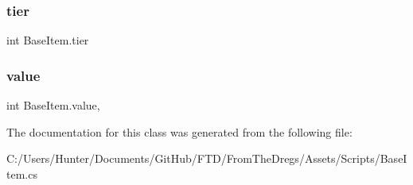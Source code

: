 \subsubsection{\texorpdfstring{tier}{tier}}
{\footnotesize\ttfamily int Base\+Item.\+tier\hspace{0.3cm}{\ttfamily [get]}}

\mbox{\label{class_base_item_ac246c2f3f1b1b6e3cae9bef5c26268a2}} 
\subsubsection{\texorpdfstring{value}{value}}
{\footnotesize\ttfamily int Base\+Item.\+value\hspace{0.3cm}{\ttfamily [get]}, {\ttfamily [set]}}



The documentation for this class was generated from the following file\+:\begin{DoxyCompactItemize}
\item 
C\+:/\+Users/\+Hunter/\+Documents/\+Git\+Hub/\+F\+T\+D/\+From\+The\+Dregs/\+Assets/\+Scripts/Base\+Item.\+cs\end{DoxyCompactItemize}
